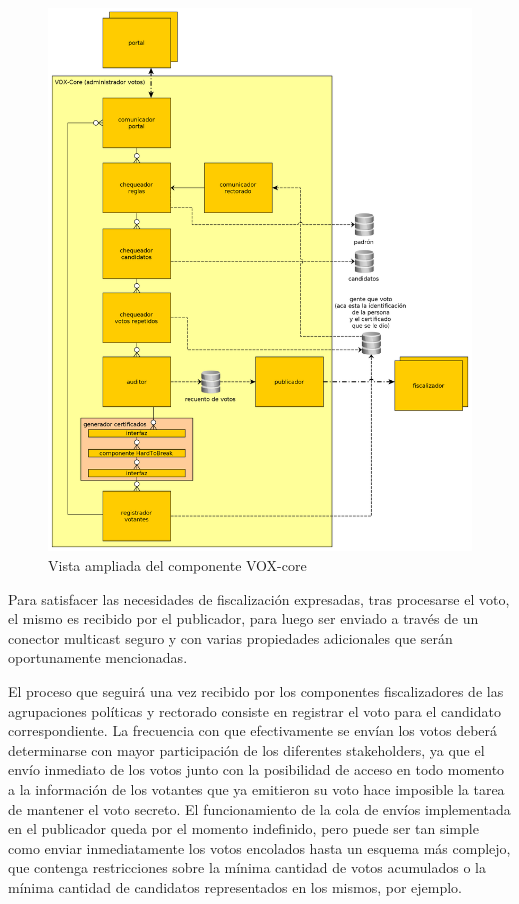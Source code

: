 \begin{figure}[H]
	\begin{center}
		\includegraphics[scale=0.26]{../diagramas/voxcore.png}
		\caption{Vista ampliada del componente VOX-core}
	\end{center} 
\end{figure} 
 
Para satisfacer las necesidades de fiscalización expresadas, tras procesarse el voto, el mismo es recibido por el publicador, 
para luego ser enviado a través de un conector multicast seguro y con varias propiedades adicionales que serán oportunamente mencionadas. %

El proceso que seguirá una vez recibido por los componentes fiscalizadores de las agrupaciones políticas y rectorado consiste en registrar el voto para el candidato correspondiente. La frecuencia con que efectivamente se envían los votos deberá determinarse con mayor participación de los diferentes stakeholders, ya que el envío inmediato de los votos junto con la posibilidad de acceso en todo momento a la información de los votantes que ya emitieron su voto hace imposible la tarea de mantener el voto secreto. El funcionamiento de la cola de envíos implementada en el publicador queda por el momento indefinido, pero puede ser tan simple como enviar inmediatamente los votos encolados hasta un esquema más complejo, que contenga restricciones sobre la mínima cantidad de votos acumulados o la mínima cantidad de candidatos representados en los mismos, por ejemplo.

